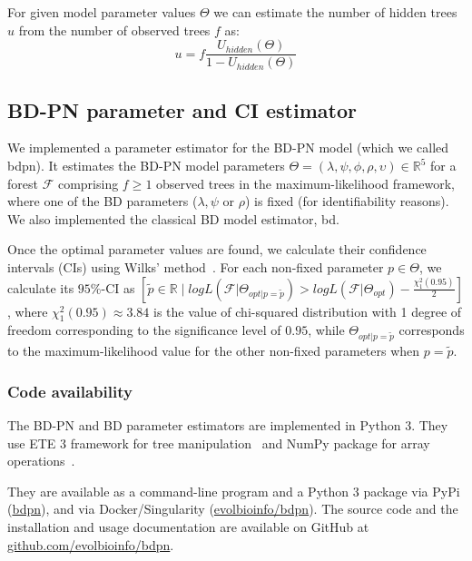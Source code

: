 \documentclass[10pt,letterpaper]{article}
\begin{document}
For given model parameter values $\Theta$ we can estimate the number of hidden trees $u$ from the number of observed trees $f$ as:
\begin{equation}
u = f \frac{U_{hidden}(\Theta)}{1 - U_{hidden}(\Theta)}\label{eq:u} 
\end{equation}


\subsection*{BD-PN parameter and CI estimator}\label{sec:tool}
We implemented a parameter estimator for the BD-PN model (which we called bdpn). It estimates the BD-PN model parameters  $\Theta = (\lambda,\psi,\phi,\rho,\upsilon) \in \mathbb{R}^5$ for a forest $\mathscr{F}$ comprising $f \geq 1$ observed trees in the maximum-likelihood framework, where one of the BD parameters ($\lambda,\psi$ or $\rho$) is fixed (for identifiability reasons). We also implemented the classical BD model estimator, bd.

Once the optimal parameter values are found, we calculate their confidence intervals (CIs) using Wilks' method~\cite{Wilks1938}.
For each non-fixed parameter $p \in \Theta$, we calculate its $95\%$-CI as $[\tilde{p} \in \mathbb{R}\; |\; log L(\mathscr{F}|\Theta_{opt|p=\tilde{p}}) > log L(\mathscr{F}| \Theta_{opt}) - \frac{\chi^2_1(0.95)}{2}]$, where $\chi^2_1(0.95) \approx 3.84$ is the value of chi-squared distribution with 1 degree of freedom corresponding to the significance level of $0.95$, while $\Theta_{opt|p=\tilde{p}}$ corresponds to the maximum-likelihood value for the other non-fixed parameters when $p = \tilde{p}$. 

\subsubsection*{Code availability}
The BD-PN and BD parameter estimators are implemented in Python 3. They use ETE 3 framework for tree manipulation~\cite{Huerta-Cepas2016} and NumPy package for array operations~\cite{harris_array_2020}. 

They are available as a command-line program and a Python 3 package via PyPi (\href{https://pypi.org/project/bdpn}{bdpn}), and via Docker/Singularity (\href{https://hub.docker.com/r/evolbioinfo/bdpn/tags}{evolbioinfo/bdpn}). The source code and the installation and usage documentation are available on GitHub at \href{https://github.com/evolbioinfo/bdpn}{github.com/evolbioinfo/bdpn}.
\end{document}
